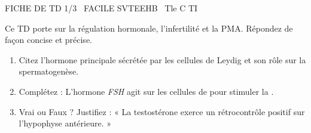 \documentclass[11pt]{article}
\begin{document}
\begin{tcolorbox}[enhanced,colback=popink,colframe=popink,arc=10pt,boxrule=0pt,left=12pt,right=12pt,top=9pt,bottom=9pt]
{\color{white}\popxbold\small FICHE DE TD 1/3 \textbullet\ FACILE \hfill SVTEEHB \textbullet\ Tle C TI\par}
\end{tcolorbox}
\vspace{4pt}
Ce TD porte sur la régulation hormonale, l'infertilité et la PMA. Répondez de façon concise et précise.

\begin{exercice}
\begin{enumerate}
    \item Citez l'hormone principale sécrétée par les cellules de Leydig et son rôle sur la spermatogenèse.
    \item Complétez : L'hormone \textit{FSH} agit sur les cellules de \underline{\hspace{3cm}} pour stimuler la \underline{\hspace{3cm}}.
    \item Vrai ou Faux ? Justifiez : « La testostérone exerce un rétrocontrôle positif sur l'hypophyse antérieure. »
\end{enumerate}
\end{exercice}
\end{document}

